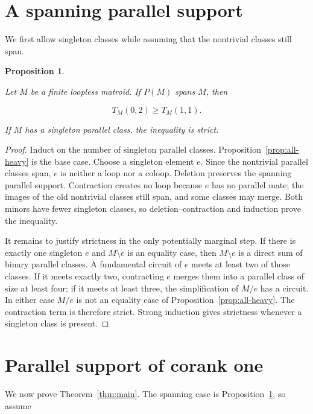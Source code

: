 \documentclass[11pt]{article}
\newtheorem{proposition}[theorem]{Proposition}
\begin{document}
\section{A spanning parallel support}


We first allow singleton classes while assuming that the nontrivial classes
still span.

\Needspace{0.18\textheight}
\begin{proposition}
\label{prop:spanning-support}

Let \(M\) be a finite loopless matroid. If \(P(M)\) spans \(M\), then

\[
T_M(0,2)\ge T_M(1,1).
\]

If \(M\) has a singleton parallel class, the inequality is strict.

\end{proposition}

\begin{proof}

Induct on the number of singleton parallel classes. Proposition~\ref{prop:all-heavy} is the
base case. Choose a singleton element \(e\). Since the nontrivial parallel
classes span, \(e\) is neither a loop nor a coloop. Deletion preserves the
spanning parallel support. Contraction creates no loop because \(e\) has no
parallel mate; the images of the old nontrivial classes still span, and some
classes may merge. Both minors have fewer singleton classes, so
deletion--contraction and induction prove the inequality.

It remains to justify strictness in the only potentially marginal step. If
there is exactly one singleton \(e\) and \(M\setminus e\) is an equality case,
then \(M\setminus e\) is a direct sum of binary parallel classes. A fundamental
circuit of \(e\) meets at least two of those classes. If it meets exactly two,
contracting \(e\) merges them into a parallel class of size at least four; if
it meets at least three, the simplification of \(M/e\) has a circuit. In either
case \(M/e\) is not an equality case of Proposition~\ref{prop:all-heavy}. The contraction term
is therefore strict. Strong induction gives strictness whenever a singleton
class is present.
\end{proof}


\section{Parallel support of corank one}


We now prove Theorem~\ref{thm:main}. The spanning case is Proposition~\ref{prop:spanning-support}, so assume
\end{document}
